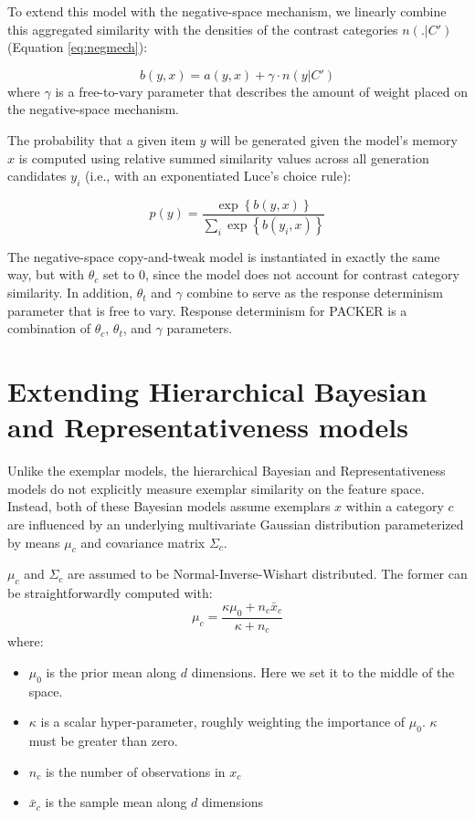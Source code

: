 \documentclass[12pt]{article} \usepackage[letterpaper, margin=1in,
\begin{document}
To extend this model with the negative-space mechanism, we linearly combine this
aggregated similarity with the densities of the contrast categories $n(.|C')$
(Equation \ref{eq:negmech}):

\begin{equation}\label{eq:negpacker}
b(y,x) = a(y,x) + \gamma \cdot n(y|C')
\end{equation}
where $\gamma$ is a free-to-vary parameter that describes the amount of weight
placed on the negative-space mechanism.

The probability that a given item $y$ will be generated given the model's memory
$x$ is computed using relative summed similarity values across all generation
candidates $y_i$ (i.e., with an exponentiated Luce's choice rule):

\begin{equation}
p(y) = \dfrac
{ \exp  \left \{ b \left( y, x \right) \right \} } 
{ \sum_i{ \exp  \left \{  b \left( y_i, x \right) \right\}  } }
\label{eq:packer-choice}
\end{equation}

The negative-space copy-and-tweak model is instantiated in exactly the same way,
but with $\theta_c$ set to 0, since the model does not account for contrast
category similarity. In addition, $\theta_t$ and $\gamma$ combine to serve as the
response determinism parameter that is free to vary. Response determinism for
PACKER is a combination of $\theta_c$, $\theta_t$, and $\gamma$ parameters.

\section{Extending Hierarchical Bayesian and Representativeness models}

Unlike the exemplar models, the hierarchical Bayesian and Representativeness
models do not explicitly measure exemplar similarity on the feature space.
Instead, both of these Bayesian models assume exemplars $x$ within a category
$c$ are influenced by an underlying multivariate Gaussian distribution
parameterized by means $\mu_c$ and covariance matrix $\Sigma_c$.

$\mu_c$ and $\Sigma_c$ are assumed to be Normal-Inverse-Wishart distributed. The
former can be straightforwardly computed with:
\begin{equation}\label{eq:mu_c}
  \mu_c = \dfrac
    {\kappa\mu_{0} + n_c \bar{x}_c}
    {\kappa + n_c}
\end{equation}
where:
\begin{itemize}
    \setlength\itemsep{-0.5em}
    \item $\mu_{0}$ is the prior mean along $d$ dimensions. Here we set it to the middle of the space.
    \item $\kappa$ is a scalar hyper-parameter, roughly weighting the importance of $\mu_{0}$. $\kappa$ must be greater than zero.
    \item $n_c$ is the number of observations in $x_c$
    \item $\bar{x}_c$ is the sample mean along $d$ dimensions
\end{itemize}
\end{document}
